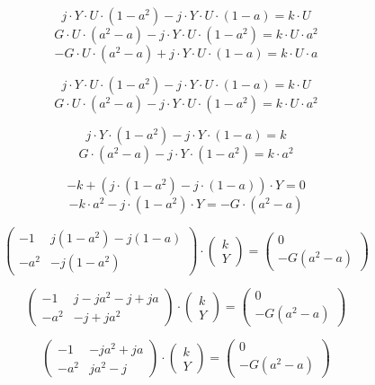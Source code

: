 \documentclass{article}
\begin{document}
$$
    j \cdot Y \cdot U \cdot (1 - a^2) - j \cdot Y \cdot U \cdot (1 - a) = k \cdot U
$$
$$
    G \cdot U \cdot (a^2 - a) - j \cdot Y \cdot U \cdot (1 - a^2) = k \cdot U \cdot a^2
$$
$$
    -G \cdot U \cdot (a^2 - a) + j \cdot Y \cdot U \cdot (1 - a) = k \cdot U \cdot a
$$

$$
    j \cdot Y \cdot U \cdot (1 - a^2) - j \cdot Y \cdot U \cdot (1 - a) = k \cdot U
$$
$$
    G \cdot U \cdot (a^2 - a) - j \cdot Y \cdot U \cdot (1 - a^2) = k \cdot U \cdot a^2
$$

$$
    j \cdot Y \cdot (1 - a^2) - j \cdot Y \cdot (1 - a) = k
$$
$$
    G \cdot (a^2 - a) - j \cdot Y \cdot (1 - a^2) = k \cdot a^2
$$

$$
    -k + \left( j \cdot (1 - a^2) - j \cdot (1 - a) \right) \cdot Y = 0
$$
$$
    -k \cdot a^2 - j \cdot (1 - a^2) \cdot Y = -G \cdot (a^2 - a)
$$

$$
    \begin{pmatrix}
        -1   & j (1 - a^2) - j (1 - a) \\
        -a^2 & - j (1 - a^2)
    \end{pmatrix}
    \cdot
    \begin{pmatrix}
        k \\
        Y
    \end{pmatrix}
    =
    \begin{pmatrix}
        0 \\
        -G (a^2 - a)
    \end{pmatrix}
$$

$$
    \begin{pmatrix}
        -1   & j - j a^2 - j + j a \\
        -a^2 & - j + j a^2
    \end{pmatrix}
    \cdot
    \begin{pmatrix}
        k \\
        Y
    \end{pmatrix}
    =
    \begin{pmatrix}
        0 \\
        - G (a^2 - a)
    \end{pmatrix}
$$

$$
    \begin{pmatrix}
        -1   & - j a^2 + j a \\
        -a^2 & j a^2 - j
    \end{pmatrix}
    \cdot
    \begin{pmatrix}
        k \\
        Y
    \end{pmatrix}
    =
    \begin{pmatrix}
        0 \\
        - G (a^2 - a)
    \end{pmatrix}
$$
\end{document}
